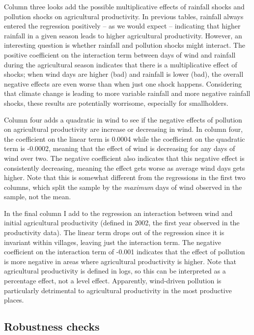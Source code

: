 \documentclass[
]{article}
\begin{document}
Column three looks add the possible multiplicative effects of rainfall shocks and pollution shocks on agricultural productivity. In previous tables, rainfall always entered the regression positively -- as we would expect -- indicating that higher rainfall in a given season leads to higher agricultural productivity. However, an interesting question is whether rainfall and pollution shocks might interact. The positive coefficient on the interaction term between days of wind and rainfall during the agricultural season indicates that there is a multiplicative effect of shocks; when wind days are higher (bad) and rainfall is lower (bad), the overall negative effects are even worse than when just one shock happens. Considering that climate change is leading to more variable rainfall and more negative rainfall shocks, these results are potentially worrisome, especially for smallholders.

Column four adds a quadratic in wind to see if the negative effects of pollution on agricultural productivity are increase or decreasing in wind. In column four, the coefficient on the linear term is 0.0004 while the coefficient on the quadratic term is -0.0002, meaning that the effect of wind is decreasing for any days of wind over two. The negative coefficient also indicates that this negative effect is consistently decreasing, meaning the effect gets worse as average wind days gets higher. Note that this is somewhat different from the regressions in the first two columns, which split the sample by the \emph{maximum} days of wind observed in the sample, not the mean.

In the final column I add to the regression an interaction between wind and initial agricultural productivity (defined in 2002, the first year observed in the productivity data). The linear term drops out of the regression since it is invariant within villages, leaving just the interaction term. The negative coefficient on the interaction term of -0.001 indicates that the effect of pollution is more negative in areas where agricultural productivity is higher. Note that agricultural productivity is defined in logs, so this can be interpreted as a percentage effect, not a level effect. Apparently, wind-driven pollution is particularly detrimental to agricultural productivity in the most productive places.

\hypertarget{robustness-checks}{%
\subsection{Robustness checks}\label{robustness-checks}}
\end{document}
